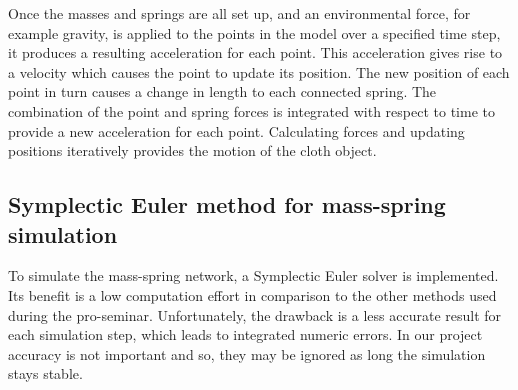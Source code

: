 Once the masses and springs are all set up, and an environmental force, for example gravity, is applied to the points in the model over a specified time step, it produces a resulting acceleration for each point. This acceleration gives rise to a velocity which causes the point to update its position. The new position of each point in turn causes a change in length to each connected spring. The combination of the point and spring forces is integrated with respect to time to provide a new acceleration for each point. Calculating forces and updating positions iteratively provides the motion of the cloth object.

\subsection{Symplectic Euler method for mass-spring simulation}
To simulate the mass-spring network, a Symplectic Euler solver is implemented. Its benefit is a low computation effort in comparison to the other methods used during the pro-seminar. Unfortunately, the drawback is a less accurate result for each simulation step, which leads to integrated numeric errors. In our project accuracy is not important and so, they may be ignored as long the simulation stays stable.

